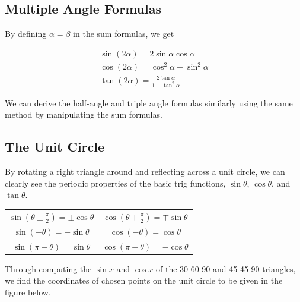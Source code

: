     \subsection{Multiple Angle Formulas}

        By defining $\alpha = \beta$ in the sum formulas, we get

        \begin{align*}
            \sin (2\alpha) = 2 \sin\alpha \cos\alpha \\
            \cos (2\alpha) = \cos ^2 \alpha - \sin ^2 \alpha \\
            \tan (2\alpha) = \frac{2\tan\alpha}{1-\tan ^2\alpha}
        \end{align*}

        \noindent We can derive the half-angle and triple angle formulas similarly using the
        same method by manipulating the sum formulas.



    \subsection{The Unit Circle}
        By rotating a right triangle around and reflecting across a unit circle, we can clearly
        see the periodic properties of the basic trig functions, $\sin\theta$, $\cos\theta$,
        and $\tan\theta$.

        \begin{center}
            \begin{tabular}{cc}
                $\sin(\theta \pm \frac{\pi}{2})=\pm\cos\theta$
                & $\cos(\theta+\frac{\pi}{2})=\mp\sin\theta$ \\
                $\sin(-\theta)=-\sin\theta$
                & $\cos(-\theta)=\cos\theta$ \\
                $\sin(\pi-\theta)=\sin\theta$
                & $\cos(\pi-\theta)=-\cos\theta$
            \end{tabular}
        \end{center}

        \noindent Through computing the $\sin x$ and $\cos x$ of the 30-60-90 and 45-45-90
        triangles, we find the coordinates of chosen points on the unit circle to be given in
        the figure below.

